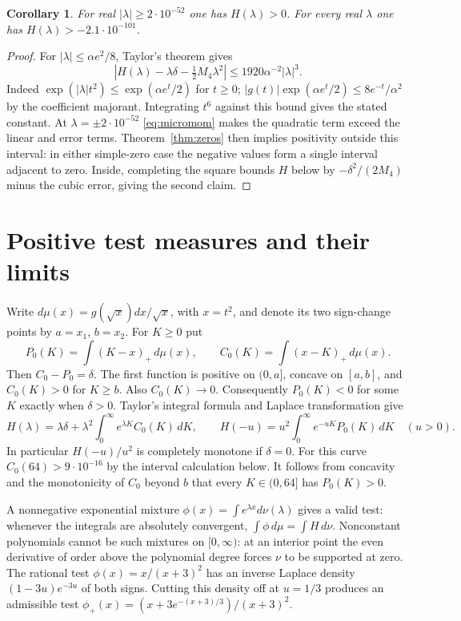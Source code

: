 \documentclass[11pt]{article}
\newtheorem{corollary}[theorem]{Corollary}
\begin{document}
\begin{corollary}
For real $|\lambda|\ge2\cdot10^{-52}$ one has $H(\lambda)>0$.
For every real $\lambda$ one has $H(\lambda)>-2.1\cdot10^{-101}$.
\end{corollary}
\begin{proof}
For $|\lambda|\le \alpha e^2/8$, Taylor's theorem gives
\[
 |H(\lambda)-\lambda\delta-\tfrac12 M_4\lambda^2|
 \le 1920\alpha^{-2}|\lambda|^3.
\]
Indeed $\exp(|\lambda|t^2)\le\exp(\alpha e^t/2)$ for $t\ge0$;
$|g(t)|\exp(\alpha e^t/2)\le8e^{-t}/\alpha^2$ by the coefficient
majorant. Integrating $t^6$ against this bound gives the stated
constant. At $\lambda=\pm 2\cdot10^{-52}$ \eqref{eq:micromom}
makes the quadratic term exceed the linear and error terms.
Theorem~\ref{thm:zeros} then implies positivity outside this interval:
in either simple-zero case the negative values form a single interval
adjacent to zero. Inside, completing the square bounds $H$ below by
$-\delta^2/(2M_4)$ minus the cubic error, giving the second claim.
\end{proof}

\section{Positive test measures and their limits}

Write $d\mu(x)=g(\sqrt x)dx/\sqrt x$, with $x=t^2$, and denote its
two sign-change points by $a=x_1$, $b=x_2$. For $K\ge0$ put
\[
 P_0(K)=\int(K-x)_+\,d\mu(x),\qquad C_0(K)=\int(x-K)_+\,d\mu(x).
\]
Then $C_0-P_0=\delta$. The first function is positive on $(0,a]$,
concave on $[a,b]$, and $C_0(K)>0$ for $K\ge b$. Also $C_0(K)\to0$.
Consequently $P_0(K)<0$ for some $K$ exactly when $\delta>0$.
Taylor's integral formula and Laplace transformation give
\[
 H(\lambda)=\lambda\delta+
       \lambda^2\int_0^\infty e^{\lambda K}C_0(K)\,dK,\qquad
 H(-u)=u^2\int_0^\infty e^{-uK}P_0(K)\,dK\quad(u>0).
\]
In particular $H(-u)/u^2$ is completely monotone if $\delta=0$.
For this curve $C_0(64)>9\cdot10^{-16}$ by the interval calculation
below. It follows from concavity and the monotonicity of $C_0$ beyond
$b$ that every $K\in(0,64]$ has $P_0(K)>0$.

A nonnegative exponential mixture $\phi(x)=\int e^{\lambda x}d\nu(\lambda)$
gives a valid test: whenever the integrals are absolutely convergent,
$\int\phi\,d\mu=\int H\,d\nu$. Nonconstant polynomials cannot be
such mixtures on $[0,\infty)$: at an interior point the even derivative
of order above the polynomial degree forces $\nu$ to be supported at zero.
The rational test $\phi(x)=x/(x+3)^2$ has an inverse Laplace density
$(1-3u)e^{-3u}$ of both signs. Cutting this density off at $u=1/3$
produces an admissible test
$\phi_+(x)=(x+3e^{-(x+3)/3})/(x+3)^2$.
\end{document}
